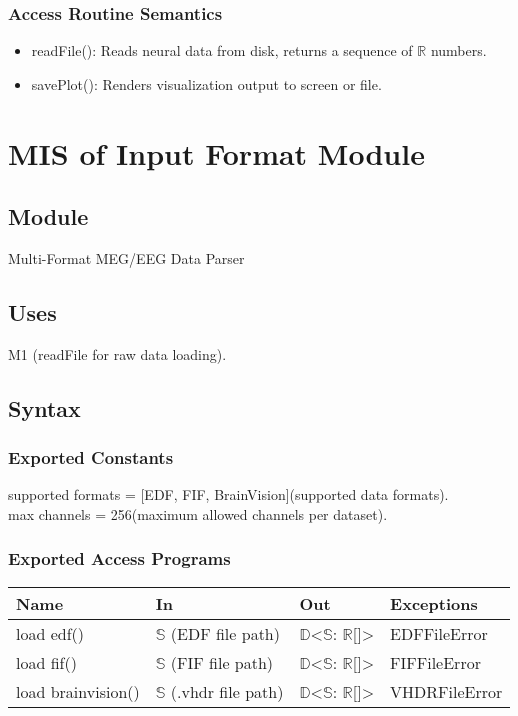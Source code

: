 \documentclass[12pt, titlepage]{article}
\begin{document}
\subsubsection{Access Routine Semantics}

\begin{itemize}
\item readFile(): Reads neural data from disk, returns a sequence of $\mathbb{R}$ numbers.


\item savePlot(): Renders visualization output to screen or file.


\end{itemize}




\section{MIS of Input Format Module}

\subsection{Module}
Multi-Format MEG/EEG Data Parser

\subsection{Uses}

\item M1 (readFile for raw data loading).

\subsection{Syntax}

\subsubsection{Exported Constants}

supported formats = [EDF, FIF, BrainVision](supported data formats).\\
max channels = 256(maximum allowed channels per dataset).


\subsubsection{Exported Access Programs}

\begin{center}
\begin{tabular}{p{2cm} p{4cm} p{4cm} p{2cm}}
\hline
\textbf{Name} & \textbf{In} & \textbf{Out} & \textbf{Exceptions} \\
\hline
load edf() & $\mathbb{S}$ (EDF file path) & $\mathbb{D}$<$\mathbb{S}$: $\mathbb{R}$[]> & EDFFileError \\
load fif() & $\mathbb{S}$ (FIF file path) & $\mathbb{D}$<$\mathbb{S}$: $\mathbb{R}$[]> & FIFFileError \\
load brainvision() & $\mathbb{S}$ (.vhdr file path) & $\mathbb{D}$<$\mathbb{S}$: $\mathbb{R}$[]> & VHDRFileError \\
\hline
\end{tabular}
\end{center}
\end{document}
